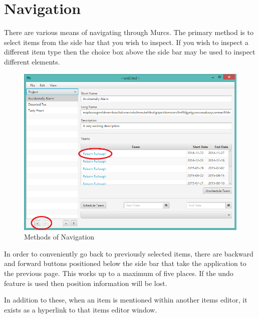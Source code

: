 \section{Navigation}

There are various means of navigating through Murcs. The primary method is to select items from the side bar that you wish to inspect. If you wish to inspect a different item type then the choice box above the side bar may be used to inspect different elements.

\begin{figure}[H]
\centering
\includegraphics[width=\textwidth]{images/screenshots/navigation.PNG}
\caption{Methods of Navigation}
\label{fig:new_project}
\end{figure}

In order to conveniently go back to previously selected items, there are backward and forward buttons positioned below the side bar that take the application to the previous page. This works up to a maximum of five places. If the undo feature is used then position information will be lost.

In addition to these, when an item is mentioned within another items editor, it exists as a hyperlink to that items editor window.